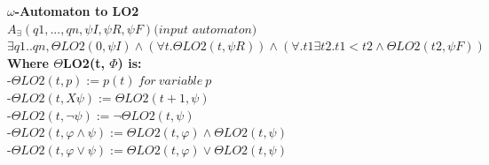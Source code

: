 \documentclass{article}
\begin{document}
\begin{multicols}{4}
\textbf{$\omega$-Automaton to LO2} \\
$A_{\exists}({q1,...,qn}, \psi I, \psi R, \psi F) \textit{(input automaton)}$ \\
$\exists q1..qn, \Theta LO2(0,\psi I) \wedge (\forall t.\Theta LO2(t,\psi R)) \wedge (\forall.t1\exists t2. t1 < t2 \wedge \Theta LO2(t2,\psi F))$ \\
\textbf{Where $\Theta$LO2(t, $\Phi$) is:} \\
-$\Theta LO2(t, p) := p(t)\ for\ variable\ p $ \\
-$\Theta LO2(t, X\psi) := \Theta LO2(t+1, \psi)$ \\
-$\Theta LO2(t, \neg\psi) := \neg\Theta LO2(t, \psi)$ \\
-$\Theta LO2(t, \varphi\wedge\psi) := \Theta LO2(t, \varphi) \wedge \Theta LO2(t, \psi)$ \\
-$\Theta LO2(t, \varphi\vee\psi) := \Theta LO2(t, \varphi) \vee \Theta LO2(t, \psi)$ \\
\end{multicols}
\end{document}
